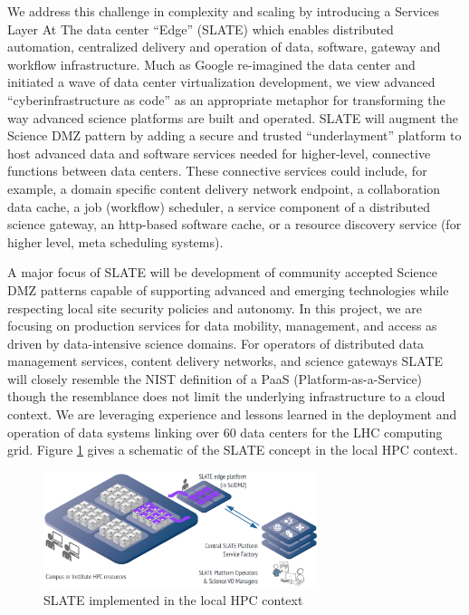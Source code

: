 \documentclass[sigconf]{acmart}
\begin{document}
We address this challenge in complexity and scaling by introducing a Services Layer At The data center “Edge” (SLATE) which enables distributed automation, centralized delivery and operation of data, software, gateway and workflow infrastructure. Much as Google re-imagined the data center \cite{GoogleDataCenter} and initiated a wave of data center virtualization development, we view advanced “cyberinfrastructure as code” as an appropriate metaphor for transforming the way advanced science platforms are built and operated.  SLATE will augment the Science DMZ pattern \cite{Dart2013} by adding a secure and trusted “underlayment” platform to host advanced data and software services needed for higher-level, connective functions between data centers. These connective services could include, for example, a domain specific content delivery network endpoint, a collaboration data cache, a job (workflow) scheduler, a service component of a distributed science gateway, an http-based software cache, or a resource discovery service (for higher level, meta scheduling systems).

A major focus of SLATE will be development of community accepted Science DMZ patterns capable of supporting advanced and emerging technologies while respecting local site security policies and autonomy. In this project, we are focusing on production services for data mobility, management, and access as driven by data-intensive science domains.  For operators of distributed data management services, content delivery networks, and science gateways SLATE will closely resemble the NIST definition \cite{Mell2011} of a PaaS (Platform-as-a-Service) though the resemblance does not limit the underlying infrastructure to a cloud context.  We are leveraging experience and lessons learned in the deployment and operation of data systems linking over 60 data centers for the LHC computing grid. Figure \ref{fig:slate_vision} gives a schematic of the SLATE concept in the local HPC context.

\begin{figure}
    \centering
    \includegraphics[width=8cm]{slate_vision.png}
    \caption{SLATE implemented in the local HPC context}
    \label{fig:slate_vision}
\end{figure}
\end{document}
